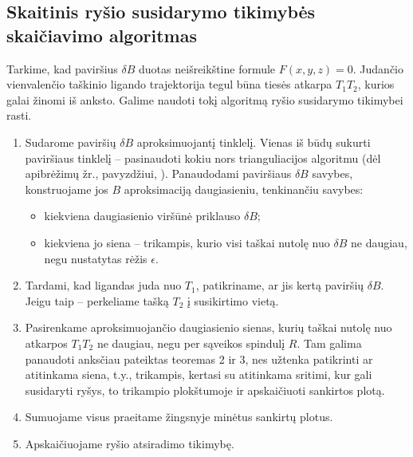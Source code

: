 \documentclass[10pt]{article}
\begin{document}
 
\subsection{Skaitinis ryšio susidarymo tikimybės skaičiavimo algoritmas}
Tarkime, kad paviršius $ \delta B $ duotas neišreikštine formule $ F(x,y,z) = 0 $. Judančio vienvalenčio taškinio ligando trajektorija tegul būna tiesės atkarpa $ T_{1}T_{2} $, kurios galai žinomi iš anksto. Galime naudoti tokį  algoritmą ryšio susidarymo tikimybei rasti.

\begin{enumerate}
\item Sudarome paviršių $ \delta B $ aproksimuojantį tinklelį. Vienas iš būdų sukurti paviršiaus tinklelį -- pasinaudoti kokiu nors trianguliacijos algoritmu (dėl apibrėžimų žr., pavyzdžiui, \cite{Trian10}  ). Panaudodami  paviršiaus $ \delta B $ savybes, konstruojame jos $ B $ aproksimaciją daugiasieniu, tenkinančiu savybes:
\begin{itemize}

\item kiekviena daugiasienio viršūnė priklauso $ \delta B $;

\item kiekviena jo siena -- trikampis, kurio visi taškai nutolę nuo $ \delta B $ ne daugiau, negu nustatytas rėžis $ \epsilon $.

\end{itemize}

\item Tardami, kad ligandas juda nuo $ T_1 $, patikriname, ar jis kertą paviršių $ \delta B $. Jeigu taip -- perkeliame tašką $ T_2 $ į susikirtimo vietą.

\item Pasirenkame aproksimuojančio daugiasienio sienas, kurių taškai nutolę nuo atkarpos $ T_{1}T_{2} $ ne daugiau, negu per sąveikos spindulį $ R $. Tam galima panaudoti anksčiau pateiktas teoremas 2 ir 3, nes užtenka patikrinti ar atitinkama siena, t.y., trikampis, kertasi su atitinkama sritimi, kur gali susidaryti ryšys,  to trikampio  plokštumoje ir apskaičiuoti sankirtos plotą.

\item Sumuojame visus praeitame žingsnyje minėtus sankirtų plotus.

\item Apskaičiuojame ryšio atsiradimo tikimybę.
   
\end{enumerate}
\end{document}
